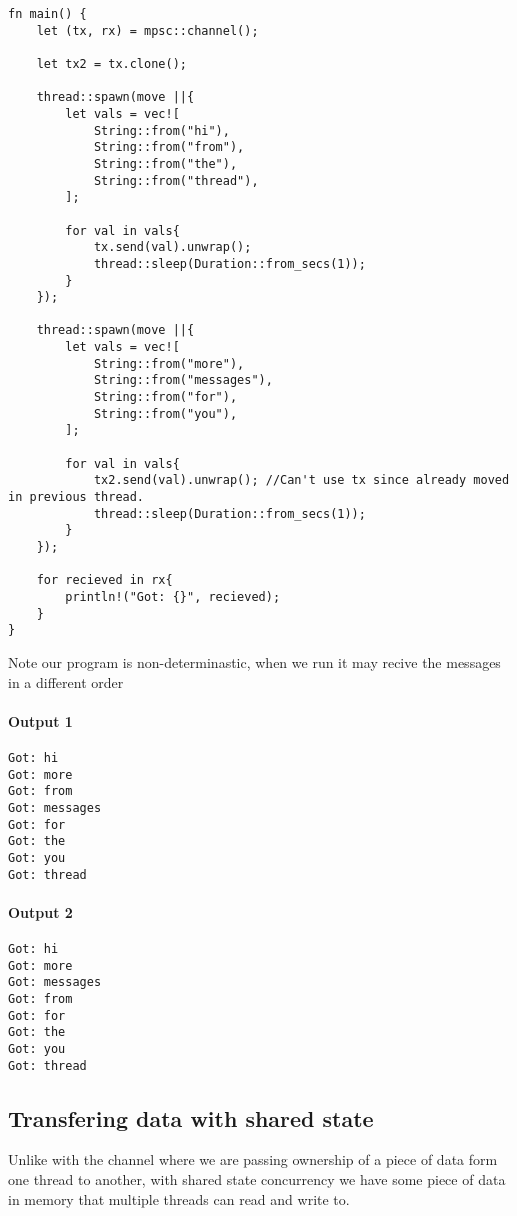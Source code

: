 \begin{lstlisting}
fn main() {
    let (tx, rx) = mpsc::channel();

    let tx2 = tx.clone();

    thread::spawn(move ||{ 
        let vals = vec![
            String::from("hi"),
            String::from("from"),
            String::from("the"),
            String::from("thread"),
        ];

        for val in vals{
            tx.send(val).unwrap();
            thread::sleep(Duration::from_secs(1));
        }
    });

    thread::spawn(move ||{ 
        let vals = vec![
            String::from("more"),
            String::from("messages"),
            String::from("for"),
            String::from("you"),
        ];

        for val in vals{
            tx2.send(val).unwrap(); //Can't use tx since already moved in previous thread.
            thread::sleep(Duration::from_secs(1));
        }
    });

    for recieved in rx{ 
        println!("Got: {}", recieved);
    }
}
\end{lstlisting}

Note our program is non-determinastic, when we run it may recive the messages in a different order

\paragraph*{Output 1}\begin{lstlisting}
Got: hi
Got: more
Got: from
Got: messages
Got: for
Got: the
Got: you
Got: thread
\end{lstlisting}

\paragraph*{Output 2}\begin{lstlisting}
Got: hi
Got: more
Got: messages
Got: from
Got: for
Got: the
Got: you
Got: thread
\end{lstlisting}
\subsection{Transfering data with shared state}
Unlike with the channel where we are passing ownership of a piece of data form one thread to another, with shared state concurrency we have some piece of data in memory that multiple threads can read and write to.

